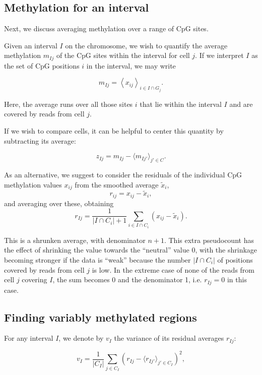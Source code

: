 \documentclass[10pt]{article}
\begin{document}
\subsection*{Methylation for an interval}

Next, we discuss averaging methylation over a range of CpG sites.

Given an interval $I$ on the chromosome, we wish to quantify the average methylation $m_{Ij}$ of the CpG sites within the interval for cell $j$.
If we interpret $I$ as the set of CpG positions $i$ in the interval, we may write

\[ m_{Ij} = \left< x_{ij} \right>_{i\in I\cap G_j}.\]

Here, the average runs over all those sites $i$ that lie within the interval $I$ and are covered by reads from cell $j$.

If we wish to compare cells, it can be helpful to center this quantity by subtracting its average:

\[ z_{Ij} = m_{Ij} - \langle m_{Ij'}\rangle_{j'\in C}.\]

As an alternative, we suggest to consider the residuals of the individual CpG methylation values $x_{ij}$ from the smoothed average $\tilde x_i$,
\[ r_{ij} = x_{ij} - \tilde x_i, \]
and averaging over these, obtaining
\begin{equation} 
r_{Ij} = \frac{1}{|I\cap C_i|+1}\sum_{i\in I\cap C_i}\left( x_{ij} - \tilde x_i \right).
\label{avgres}
\end{equation}

This is a shrunken average, with denominator $n+1$.
This extra pseudocount has the effect of shrinking the value towards the ``neutral'' value 0, with the shrinkage becoming stronger if the data is ``weak'' because the number $|I\cap C_i|$ of positions covered by reads from cell $j$  is low.
In the extreme case of none of the reads from cell $j$ covering $I$, the sum becomes 0 and the denominator 1, i.e.
$r_{Ij}=0$ in this case.

\subsection*{Finding variably methylated regions}

For any interval $I$, we denote by $v_I$ the variance of its residual averages $r_{Ij}$:

\begin{equation} 
v_I = \frac{1}{|C_I|}\sum_{j\in C_I}\left( r_{Ij} - \langle r_{Ij'}\rangle_{j'\in C_I} \right)^2, \label{var}
\end{equation}
\end{document}
